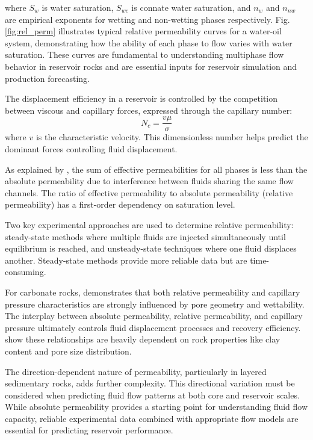 \documentclass[journal]{IEEEtran}
\begin{document}
where $S_w$ is water saturation, $S_{wc}$ is connate water saturation, and $n_w$ and $n_{nw}$ are empirical exponents for wetting and non-wetting phases respectively. Fig. \ref{fig:rel_perm} illustrates typical relative permeability curves for a water-oil system, demonstrating how the ability of each phase to flow varies with water saturation. These curves are fundamental to understanding multiphase flow behavior in reservoir rocks and are essential inputs for reservoir simulation and production forecasting.

The displacement efficiency in a reservoir is controlled by the competition between viscous and capillary forces, expressed through the capillary number:
\begin{equation}
N_c = \frac{v\mu}{\sigma}
\end{equation}
where $v$ is the characteristic velocity. This dimensionless number helps predict the dominant forces controlling fluid displacement.

As explained by \textcite{honarpour_relative-permeability_1988}, the sum of effective permeabilities for all phases is less than the absolute permeability due to interference between fluids sharing the same flow channels. The ratio of effective permeability to absolute permeability (relative permeability) has a first-order dependency on saturation level.

Two key experimental approaches are used to determine relative permeability: steady-state methods where multiple fluids are injected simultaneously until equilibrium is reached, and unsteady-state techniques where one fluid displaces another. Steady-state methods provide more reliable data but are time-consuming.

For carbonate rocks, \textcite{f_jerry_lucia_2_rock-fabricpetrophysical_1995} demonstrates that both relative permeability and capillary pressure characteristics are strongly influenced by pore geometry and wettability. The interplay between absolute permeability, relative permeability, and capillary pressure ultimately controls fluid displacement processes and recovery efficiency. \textcite{yang_permeabilityporosity_2010} show these relationships are heavily dependent on rock properties like clay content and pore size distribution.

The direction-dependent nature of permeability, particularly in layered sedimentary rocks, adds further complexity. This directional variation must be considered when predicting fluid flow patterns at both core and reservoir scales. While absolute permeability provides a starting point for understanding fluid flow capacity, reliable experimental data combined with appropriate flow models are essential for predicting reservoir performance.
\end{document}
